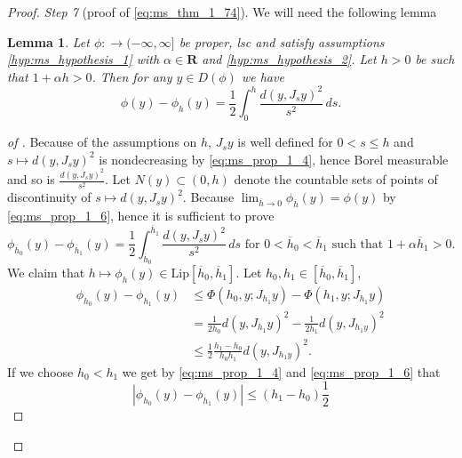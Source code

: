 \documentclass[a4paper,11pt, leqno]{scrreprt} %
\renewcommand{\leq}{\leqslant}
\renewcommand{\leq}{\leqslant}
\newcommand{\R}{\mathbf R}
\theoremstyle{change}
\newcounter{acounter}[chapter]
\newtheorem{lemma}[acounter]{Lemma}
\theoremstyle{nonumberplain}
\newtheorem{proof}{Proof}
\begin{document}
\begin{proof}
  \textit{Step 7} (proof of \eqref{eq:ms_thm_1_74}). We will need the
  following lemma
  \begin{lemma}\label{lem:ms_lem_4}
    Let $\phi:  \to (-\infty, \infty]$ be proper, lsc and satisfy
    assumptions \ref{hyp:ms_hypothesis_1} with $\alpha \in 
    \R$ and \ref{hyp:ms_hypothesis_2}. Let $h > 0$ be such that $1 +
    \alpha h > 0$. Then for any $y \in D(\phi)$ we have
    \begin{equation}
      \label{eq:ms_thm_1_77}
      \phi(y) - \phi_h(y) = \frac12 \int_0^h \frac{d(y, J_s y)^2}{s^2}
      \, ds.
    \end{equation}
  \end{lemma}
  \begin{proof}[of ]
    Because of the assumptions on $h$, $J_s y$ is well defined for $0
    < s \leq h$ and $s \mapsto d(y, J_s y)^2$ is nondecreasing by
    \eqref{eq:ms_prop_1_4}, hence Borel measurable and so is
    $\frac{d(y, J_s y)^2}{s^2}$. Let $N(y) \subset (0, h)$ denote the
    countable sets of points of discontinuity of $s \mapsto d(y, J_s
    y)^2$. Because $\lim_{\overline h \to 0} \phi_{\overline h}(y) =
    \phi(y)$ by \eqref{eq:ms_prop_1_6}, hence it is sufficient to prove
    \begin{equation}
      \label{eq:ms_thm_1_78}
      \phi_{\overline h_0}(y) - \phi_{\overline h_1}(y) = \frac12
      \int_{\overline h_0}^{\overline h_1} \frac{d(y, J_s y)^2}{s^2}
      \, ds \text{ for $0 < \overline h_0 < \overline h_1$ such that $1
        + \alpha \overline h_1 > 0$.}
    \end{equation}
    We claim that $h \mapsto \phi_h(y) \in \text{Lip}[\overline h_0,
    \overline h_1]$. Let $h_0, h_1 \in [\overline h_0,
    \overline h_1]$,
    \begin{equation}
      \label{eq:ms_thm_1_79}
      \begin{split}
        \phi_{h_0}(y) - \phi_{h_1}(y) &\leq \Phi(h_0, y; J_{h_1} y) -
        \Phi(h_1, y; J_{h_1} y)\\
        &=\frac1{2h_0} d(y, J_{h_1} y)^2 - \frac1{2h_1} d(y, J_{h_1
          y})^2\\
        &\leq \frac12 \frac{h_1 - h_0}{h_0 h_1} d(y, J_{h_1 y})^2.
      \end{split}
    \end{equation}
    If we choose $h_0 < h_1$ we get by \eqref{eq:ms_prop_1_4} and
    \eqref{eq:ms_prop_1_6} that
    \begin{equation}
      \label{eq:ms_thm_1_80}
      |\phi_{h_0}(y) - \phi_{h_1}(y)| \leq (h_1 - h_0) \frac12

\end{equation}
\end{proof}
\end{proof}
\end{document}
